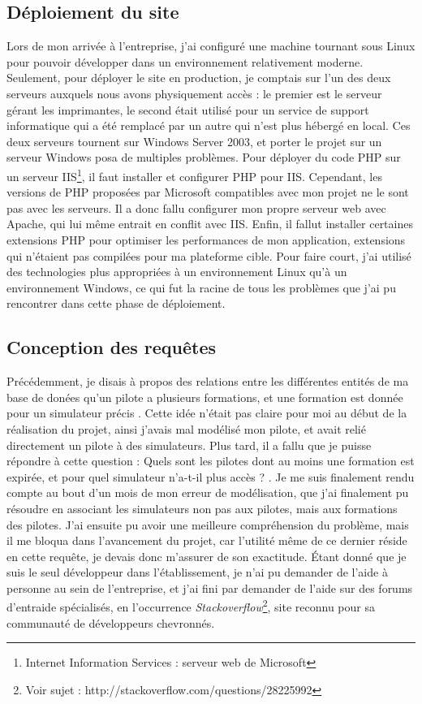 \documentclass[a4paper,french,11pt,openany,oneside]{memoir}
\begin{document}
\subsection{Déploiement du site}

Lors de mon arrivée à l'entreprise, j'ai configuré une machine tournant sous Linux pour pouvoir développer dans un environnement relativement moderne. Seulement, pour déployer le site en production, je comptais sur l'un des deux serveurs auxquels nous avons physiquement accès : le premier est le serveur gérant les imprimantes, le second était utilisé pour un service de support informatique qui a été remplacé par un autre qui n'est plus hébergé en local. Ces deux serveurs tournent sur Windows Server 2003, et porter le projet sur un serveur Windows posa de multiples problèmes.
Pour déployer du code PHP sur un serveur IIS\footnote{Internet Information Services : serveur web de Microsoft}, il faut installer et configurer PHP pour IIS. Cependant, les versions de PHP proposées par Microsoft compatibles avec mon projet ne le sont pas avec les serveurs. Il a donc fallu configurer mon propre serveur web avec Apache, qui lui même entrait en conflit avec IIS. Enfin, il fallut installer certaines extensions PHP pour optimiser les performances de mon application, extensions qui n'étaient pas compilées pour ma plateforme cible. Pour faire court, j'ai utilisé des technologies plus appropriées à un environnement Linux qu'à un environnement Windows, ce qui fut la racine de tous les problèmes que j'ai pu rencontrer dans cette phase de déploiement.

\subsection{Conception des requêtes}

Précédemment, je disais à propos des relations entre les différentes entités de ma base de donées qu'\og un pilote a plusieurs formations, et une formation est donnée pour un simulateur précis \fg. Cette idée n'était pas claire pour moi au début de la réalisation du projet, ainsi j'avais mal modélisé mon pilote, et avait relié directement un pilote à des simulateurs. Plus tard, il a fallu que je puisse répondre à cette question : \og Quels sont les pilotes dont au moins une formation est expirée, et pour quel simulateur n'a-t-il plus accès ? \fg. Je me suis finalement rendu compte au bout d'un mois de mon erreur de modélisation, que j'ai finalement pu résoudre en associant les simulateurs non pas aux pilotes, mais aux formations des pilotes. J'ai ensuite pu avoir une meilleure compréhension du problème, mais il me bloqua dans l'avancement du projet, car l'utilité même de ce dernier réside en cette requête, je devais donc m'assurer de son exactitude. Étant donné que je suis le seul développeur dans l'établissement, je n'ai pu demander de l'aide à personne au sein de l'entreprise, et j'ai fini par demander de l'aide sur des forums d'entraide spécialisés, en l'occurrence \emph{Stackoverflow}\footnote{Voir sujet : http://stackoverflow.com/questions/28225992}, site reconnu pour sa communauté de développeurs chevronnés.
\end{document}
